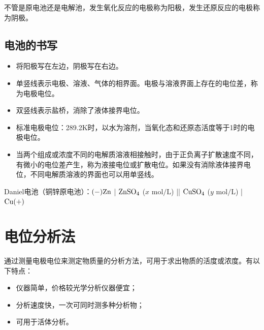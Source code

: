 
不管是原电池还是电解池，发生氧化反应的电极称为阳极，发生还原反应的电极称为阴极。

\subsection{电池的书写}
\begin{itemize}
	\item 将阳极写在左边，阴极写在右边。
	\item 单竖线表示电极、溶液、气体的相界面。电极与溶液界面上存在的电位差，称为电极电位。
	\item 双竖线表示盐桥，消除了液体接界电位。
\end{itemize}

\begin{note}
	\begin{itemize}
		\item 标准电极电位：289.2K时，以水为溶剂，当氧化态和还原态活度等于1时的电极电位。
		\item 当两个组成或浓度不同的电解质溶液相接触时，由于正负离子扩散速度不同，有微小的电位差产生，称为液接电位或扩散电位。如果没有消除液体接界电位，不同电解质溶液的界面也可以用单竖线。
	\end{itemize}
\end{note}

\begin{example}
	Daniel电池（铜锌原电池）：$(-)\ce{Zn}$ | $\ce{ZnSO4}$ ($x$ $\mathrm{mol/L}$) || $\ce{CuSO4}$ ($y$ $\mathrm{mol/L}$) | $\ce{Cu}(+)$
\end{example}


\section{电位分析法}

通过测量电极电位来测定物质量的分析方法，可用于求出物质的活度或浓度。有以下特点：
\begin{itemize}
	\item 仪器简单，价格较光学分析仪器便宜；
	\item 分析速度快，一次可同时测多种分析物；
	\item 可用于活体分析。
\end{itemize}


